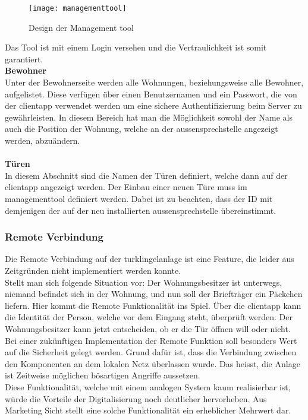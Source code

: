 \begin{figure}[htb!]
	\begin{center}
		\texttt{[image: managementtool]}
		\caption[Design der Management tool]{Design der Management tool}
		\label{fig:managementtool}
	\end{center}
\end{figure}

Das Tool ist mit einem Login versehen und die Vertraulichkeit ist somit garantiert.
\\
\newline
\textbf{Bewohner} 
\\
Unter der Bewohnerseite werden alle Wohnungen, beziehungsweise alle Bewohner, aufgelistet. Diese verfügen über einen Benutzernamen und ein Passwort, die von der \gls{clientapp} verwendet werden um eine sichere Authentifizierung beim Server zu gewährleisten. In diesem Bereich hat man die Möglichkeit sowohl der Name als auch die Position der Wohnung, welche an der \gls{aussensprechstelle} angezeigt werden, abzuändern.
\\
\\
\textbf{Türen} 
\\
In diesem Abschnitt sind die Namen der Türen definiert, welche dann auf der \gls{clientapp} angezeigt werden. Der Einbau einer neuen Türe muss im \gls{managementtool} definiert werden. Dabei ist zu beachten, dass der ID mit demjenigen der auf der neu installierten \gls{aussensprechstelle} übereinstimmt. 
\\

\subsubsection{Remote Verbindung}
\label{kap:remote}
Die Remote Verbindung auf der \gls{turklingelanlage} ist eine Feature, die leider aus Zeitgründen nicht implementiert werden konnte. 
\\
Stellt man sich folgende Situation vor: Der Wohnungsbesitzer ist unterwegs, niemand befindet sich in der Wohnung, und nun soll der Briefträger ein Päckchen liefern. Hier kommt die Remote Funktionalität ins Spiel. Über die \gls{clientapp} kann die Identität der Person, welche vor dem Eingang steht, überprüft werden. Der Wohnungsbesitzer kann jetzt entscheiden, ob er die Tür öffnen will oder nicht. Bei einer zukünftigen Implementation der Remote Funktion soll besonders Wert auf die Sicherheit gelegt werden. Grund dafür ist, dass die Verbindung zwischen den Komponenten an dem lokalen Netz überlassen wurde. Das heisst, die Anlage ist Zeitweise möglichen bösartigen Angriffe aussetzen. 
\\
Diese Funktionalität, welche mit einem analogen System kaum realisierbar ist, würde die Vorteile der Digitalisierung noch deutlicher hervorheben. Aus Marketing Sicht stellt eine solche Funktionalität ein erheblicher Mehrwert dar. 


